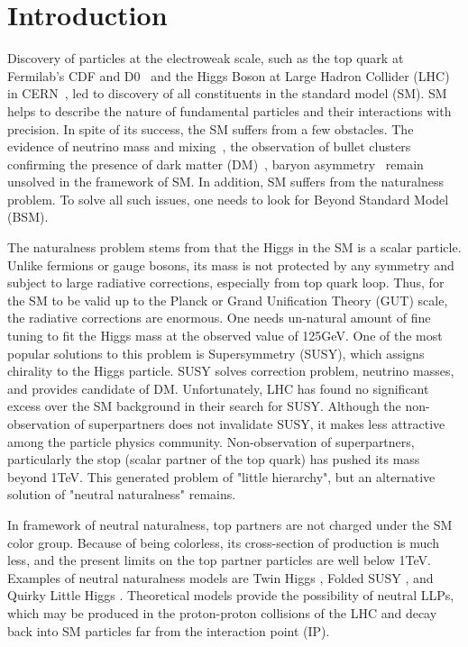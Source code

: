 \section{Introduction}\label{sec:introduction}

Discovery of particles at the electroweak scale, such as the top quark at Fermilab's CDF and D0~\cite{topD0,topCDF} and the Higgs Boson at Large Hadron Collider (LHC) in CERN~\cite{higgscms,higgsatlas}, led to discovery of all constituents in the standard model (SM). 
SM helps to describe the nature of fundamental particles and their interactions with precision. 
In spite of its success, the SM suffers from a few obstacles. 
The evidence of neutrino mass and mixing~\cite{neutrino}, the observation of bullet clusters confirming the presence of dark matter (DM)~\cite{Baumgart:2009tn,Kaplan:2009ag,Chan:2011aa,Dienes:2011ja,Dienes:2012yz}, baryon asymmetry~\cite{Cui:2014twa} remain unsolved in the framework of SM. 
In addition, SM suffers from the naturalness problem. 
To solve all such issues, one needs to look for Beyond Standard Model (BSM).

The naturalness problem stems from that the Higgs in the SM is a scalar particle. 
Unlike fermions or gauge bosons, its mass is not protected by any symmetry and subject to large radiative corrections, especially from top quark loop. 
Thus, for the SM to be valid up to the Planck or Grand Unification Theory (GUT) scale, the radiative corrections are enormous. 
One needs un-natural amount of fine tuning to fit the Higgs mass at the observed value of 125GeV.
One of the most popular solutions to this problem is Supersymmetry (SUSY), which assigns chirality to the Higgs particle. 
SUSY solves correction problem, neutrino masses, and provides candidate of DM. 
Unfortunately, LHC has found no significant excess over the SM background in their search for SUSY\cite{SUSY}. 
Although the non-observation of superpartners does not invalidate SUSY, it makes less attractive among the particle physics community. 
Non-observation of superpartners, particularly the stop (scalar partner of the top quark) has pushed its mass beyond 1TeV. 
This generated problem of "little hierarchy", but an alternative solution of "neutral naturalness" remains. 


In framework of neutral naturalness, top partners are not charged under the SM color group. 
Because of being colorless, its cross-section of production is much less, and the present limits on the top partner particles are well below 1TeV. 
Examples of neutral naturalness models are Twin Higgs \cite{Chacko:2005pe},
Folded SUSY \cite{Burdman:2006tz}, and Quirky Little Higgs \cite{Cai:2008au}.
Theoretical models provide the possibility of neutral LLPs, which may be produced in the proton-proton
collisions of the LHC and decay back into SM particles far from the interaction point (IP).\cite{Craig:2015pha}


